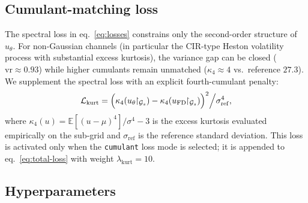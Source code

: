\documentclass[review,12pt]{elsarticle}
\begin{document}
\subsection{Cumulant-matching loss}
\label{subsec:cumulant-loss}

The spectral loss in eq.~\eqref{eq:losses} constrains only the
second-order structure of \(u_\theta\). For non-Gaussian channels (in particular the CIR-type Heston
volatility process with substantial excess kurtosis), the variance
gap can be closed (\(\mathrm{vr}
\approx 0.93\)) while higher cumulants remain unmatched
(\(\kappa_4 \approx 4\) vs.\ reference \(27.3\)). We supplement the
spectral loss with an explicit fourth-cumulant penalty:
\begin{equation}
 \mathcal{L}_{\mathrm{kurt}} =
 \Bigl(\kappa_4(u_\theta\!\!\upharpoonright_{\mathcal{G}_s}) -
    \kappa_4(u_{\mathrm{FD}}\!\!\upharpoonright_{\mathcal{G}_s})
 \Bigr)^2 \Big/ \sigma_{\mathrm{ref}}^4,
 \label{eq:cumulant-loss}
\end{equation}
where \(\kappa_4(u) = \mathbb E[(u-\mu)^4]/\sigma^4 - 3\) is the
excess kurtosis evaluated empirically on the sub-grid and
\(\sigma_{\mathrm{ref}}\) is the reference standard deviation. This
loss is activated only when the \texttt{cumulant} loss mode is
selected; it is appended to eq.~\eqref{eq:total-loss} with weight
\(\lambda_{\mathrm{kurt}} = 10\).

\subsection{Hyperparameters}
\label{subsec:hyper}
\end{document}
